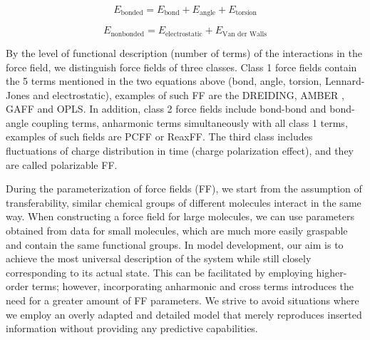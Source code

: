 \begin{equation}\label{eq:ff2}
	E_{\text{bonded}} = E_{\text{bond}} + E_{\text{angle}} + E_{\text{torsion}}
\end{equation}

\begin{equation}\label{eq:ff3}
	E_{\text{nonbonded}} = E_{\text{electrostatic}} + E_{\text{Van der Walls}}
\end{equation}

%
\newpage
By the level of functional description (number of terms) of the interactions in the force field, we distinguish force fields of three classes. Class 1 force fields contain the 5 terms mentioned in the two equations above (bond, angle, torsion, Lennard-Jones and electrostatic), examples of such FF are the DREIDING, AMBER \cite{brooks_charmm_2009}, GAFF and OPLS. In addition, class 2 force fields include bond-bond and bond-angle coupling terms, anharmonic terms simultaneously with all class 1 terms, examples of such fields are PCFF or ReaxFF.  The third class includes fluctuations of charge distribution in time (charge polarization effect), and they are called polarizable FF. \cite{vanommeslaeghe_molecular_2014}

During the parameterization of force fields (FF), we start from the assumption of transferability,  similar chemical groups of different molecules interact in the same way. When constructing a force field for large molecules, we can use parameters obtained from data for small molecules, which are much more easily graspable and contain the same functional groups. \cite{monticelli_force_2013} In model development, our aim is to achieve the most universal description of the system while still closely corresponding to its actual state. This can be facilitated by employing higher-order terms; however, incorporating anharmonic and cross terms introduces the need for a greater amount of FF parameters. We strive to avoid situations where we employ an overly adapted and detailed model that merely reproduces inserted information without providing any predictive capabilities. \cite{vanommeslaeghe_molecular_2014}

